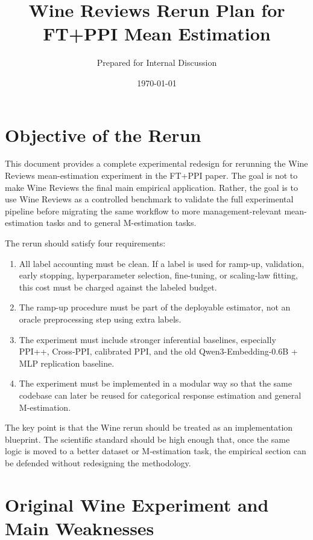\documentclass[11pt]{article}
\title{Wine Reviews Rerun Plan for FT+PPI Mean Estimation}
\author{Prepared for Internal Discussion}
\date{\today}
\begin{document}
\maketitle

\section{Objective of the Rerun}

This document provides a complete experimental redesign for rerunning the Wine Reviews mean-estimation experiment in the FT+PPI paper. The goal is not to make Wine Reviews the final main empirical application. Rather, the goal is to use Wine Reviews as a controlled benchmark to validate the full experimental pipeline before migrating the same workflow to more management-relevant mean-estimation tasks and to general M-estimation tasks.

The rerun should satisfy four requirements:

\begin{enumerate}[label=(\roman*)]
    \item All label accounting must be clean. If a label is used for ramp-up, validation, early stopping, hyperparameter selection, fine-tuning, or scaling-law fitting, this cost must be charged against the labeled budget.
    \item The ramp-up procedure must be part of the deployable estimator, not an oracle preprocessing step using extra labels.
    \item The experiment must include stronger inferential baselines, especially PPI++, Cross-PPI, calibrated PPI, and the old Qwen3-Embedding-0.6B + MLP replication baseline.
    \item The experiment must be implemented in a modular way so that the same codebase can later be reused for categorical response estimation and general M-estimation.
\end{enumerate}

The key point is that the Wine rerun should be treated as an implementation blueprint. The scientific standard should be high enough that, once the same logic is moved to a better dataset or M-estimation task, the empirical section can be defended without redesigning the methodology.

\section{Original Wine Experiment and Main Weaknesses}
\end{document}
